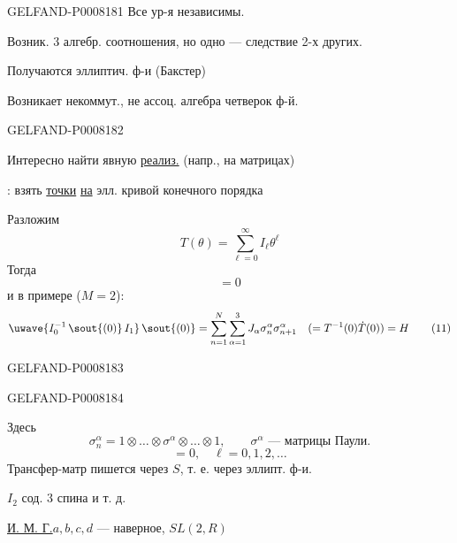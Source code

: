 \begin{GelfandAdjacentEvidence}{GELFAND-P000818}{1}
Все ур-я независимы.

Возник. 3 алгебр. соотношения, но одно — следствие 2-х других.

Получаются эллиптич. ф-и (Бакстер)

Возникает некоммут., не ассоц. алгебра четверок ф-й.
\end{GelfandAdjacentEvidence}
\begin{GelfandAdjacentEvidence}{GELFAND-P000818}{2}


Интересно найти явную \uline{реализ.} (напр., на матрицах)

: взять \uline{точки} \uline{на} элл. кривой конечного порядка

Разложим
\begin{equation*}
T(\theta)=\sum_{\ell=0}^{\infty}I_{\ell}\theta^{\ell}\tag{9}
\end{equation*}
Тогда
\begin{equation*}
[I_n,I_m]=0\tag{10}
\end{equation*}
и в примере (\(M=2\)):
\begin{equation*}
\text{\uwave{\mbox{\(\displaystyle I_0^{-1}\,\text{\sout{(0)}}\,I_1\)}}}\,
\text{\sout{(0)}}
=\sum_{n=1}^{N}\sum_{\alpha=1}^{3}J_\alpha\sigma_n^\alpha\sigma_{n+1}^\alpha
\quad(=T^{-1}(0)\dot T(0))=H\tag{11}
\end{equation*}
\end{GelfandAdjacentEvidence}
\begin{GelfandAdjacentEvidence}{GELFAND-P000818}{3}


\end{GelfandAdjacentEvidence}
\begin{GelfandAdjacentEvidence}{GELFAND-P000818}{4}


Здесь
\[
\sigma_n^\alpha=1\otimes\ldots\otimes\sigma^\alpha\otimes\ldots\otimes1,
\qquad\sigma^\alpha\text{ — матрицы Паули.}
\]
\begin{equation*}
[I_\ell,H]=0,\quad\ell=0,1,2,\ldots\tag{12}
\end{equation*}
Трансфер-матр пишется через \(S\), т. е. через эллипт. ф-и.

\(I_2\) сод. 3 спина и т. д.

\uline{И. М. Г.}\quad \(a,b,c,d\) — наверное, \(SL(2,R)\)
\end{GelfandAdjacentEvidence}
